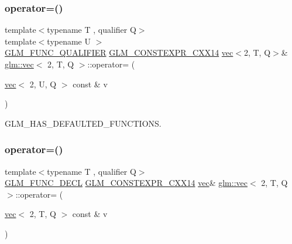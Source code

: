 \subsubsection{\texorpdfstring{operator=()}{operator=()}\hspace{0.1cm}{\footnotesize\ttfamily [1/3]}}
{\footnotesize\ttfamily template$<$typename T , qualifier Q$>$ \\
template$<$typename U $>$ \\
\mbox{\hyperlink{setup_8hpp_a33fdea6f91c5f834105f7415e2a64407}{G\+L\+M\+\_\+\+F\+U\+N\+C\+\_\+\+Q\+U\+A\+L\+I\+F\+I\+ER}} \mbox{\hyperlink{setup_8hpp_a4dd12abf5e1164bc57f3a34671d03844}{G\+L\+M\+\_\+\+C\+O\+N\+S\+T\+E\+X\+P\+R\+\_\+\+C\+X\+X14}} \mbox{\hyperlink{structglm_1_1vec}{vec}}$<$2, T, Q$>$\& \mbox{\hyperlink{structglm_1_1vec}{glm\+::vec}}$<$ 2, T, Q $>$\+::operator= (\begin{DoxyParamCaption}\item[{\mbox{\hyperlink{structglm_1_1vec}{vec}}$<$ 2, U, Q $>$ const \&}]{v }\end{DoxyParamCaption})}



G\+L\+M\+\_\+\+H\+A\+S\+\_\+\+D\+E\+F\+A\+U\+L\+T\+E\+D\+\_\+\+F\+U\+N\+C\+T\+I\+O\+NS. 

\mbox{\label{structglm_1_1vec_3_012_00_01_t_00_01_q_01_4_a1cdeb98b13f93223e04b171b4f5b7d0c}} 
\subsubsection{\texorpdfstring{operator=()}{operator=()}\hspace{0.1cm}{\footnotesize\ttfamily [2/3]}}
{\footnotesize\ttfamily template$<$typename T , qualifier Q$>$ \\
\mbox{\hyperlink{setup_8hpp_ab2d052de21a70539923e9bcbf6e83a51}{G\+L\+M\+\_\+\+F\+U\+N\+C\+\_\+\+D\+E\+CL}} \mbox{\hyperlink{setup_8hpp_a4dd12abf5e1164bc57f3a34671d03844}{G\+L\+M\+\_\+\+C\+O\+N\+S\+T\+E\+X\+P\+R\+\_\+\+C\+X\+X14}} \mbox{\hyperlink{structglm_1_1vec}{vec}}\& \mbox{\hyperlink{structglm_1_1vec}{glm\+::vec}}$<$ 2, T, Q $>$\+::operator= (\begin{DoxyParamCaption}\item[{\mbox{\hyperlink{structglm_1_1vec}{vec}}$<$ 2, T, Q $>$ const \&}]{v }\end{DoxyParamCaption})}

